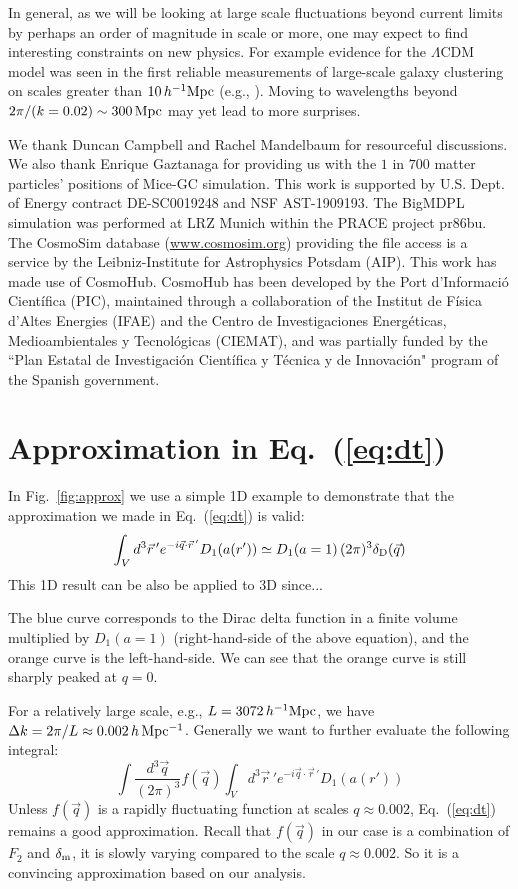 \documentclass[prd,amsmath,amssymb,floatfix,superscriptaddress,nofootinbib,twocolumn]{revtex4-1}
\def\be{\begin{equation}}
\def\ee{\end{equation}}
\newcommand{\vrr}{\vec{r}}
\newcommand{\ec}[1]{Eq.~(\ref{eq:#1})}
\newcommand{\rf}[1]{\ref{fig:#1}}
\newcommand{\peikai}[1]{{\color{blue} #1}}
\begin{document}
In general, as we will be looking at large scale fluctuations beyond current limits by perhaps an order of magnitude in scale or more, one may expect to find interesting constraints on new physics. For example evidence for the $\Lambda$CDM model was seen in the first reliable measurements of large-scale galaxy clustering on scales greater than $10\,h^{-1}\rm Mpc$ (e.g., \cite{Efstathio:1990cdm}). Moving to wavelengths beyond $2\pi/(k=0.02) \sim 300 \rm \, Mpc$ may yet lead to more surprises.

\acknowledgements
We thank Duncan Campbell and Rachel Mandelbaum for resourceful discussions. We also thank Enrique Gaztanaga for providing us with the $1$ in $700$ matter particles' positions of Mice-GC simulation. This work is supported by U.S. Dept. of Energy contract DE-SC0019248 and NSF AST-1909193.
The BigMDPL simulation was performed at LRZ Munich within the PRACE project pr86bu. The CosmoSim database (\url{www.cosmosim.org}) providing the file access is a service by the Leibniz-Institute for Astrophysics Potsdam (AIP).
This work has made use of CosmoHub. CosmoHub has been developed by the Port d'Informació Científica (PIC), maintained through a collaboration of the Institut de Física d'Altes Energies (IFAE) and the Centro de Investigaciones Energéticas, Medioambientales y Tecnológicas (CIEMAT), and was partially funded by the ``Plan Estatal de Investigación Científica y Técnica y de Innovación" program of the Spanish government.
\clearpage

\appendix 

\section{Approximation in \ec{dt}}\label{appenda}
In Fig.~\rf{approx} we use a simple 1D example to demonstrate that the approximation we made in \ec{dt} is valid:
\be 
\int_{V} d^{3}\vrr\, 'e^{-i\vec{q}\cdot \vrr\, '}{D_{1}(a(r'))}  \simeq D_{1}(a=1)\,(2\pi)^3\delta_{\rm D}(\vec{q})
\ee 
This 1D result can be also be applied to 3D \peikai{since...} 

The blue curve corresponds to the Dirac delta function in a finite volume multiplied by $D_{1}(a=1)$ (right-hand-side of the above equation), and the orange curve is the left-hand-side. We can see that the orange curve is still sharply peaked at $q=0$. 

For a relatively large scale, e.g., $L=3072\, h^{-1}\rm Mpc$, we have $\Delta k=2\pi/L\approx 0.002 \, h \, \rm Mpc^{-1}$. Generally we want to further evaluate the following integral:
\be
\int \frac{d^{3}\vec{q}}{(2\pi)^3}f(\vec{q}) \int_{V} d^{3}\vrr\, 'e^{-i\vec{q}\cdot \vrr\, '}{D_{1}(a(r'))}
\ee 
Unless $f(\vec{q})$ is a rapidly fluctuating function at scales $q \approx 0.002$, \ec{dt} remains a good approximation. Recall that $f(\vec{q})$ in our case is a combination of $F_{2}$ and $\delta_{\rm m}$, it is slowly varying compared to the scale $q \approx 0.002$. So it is a convincing approximation based on our analysis.
\end{document}
